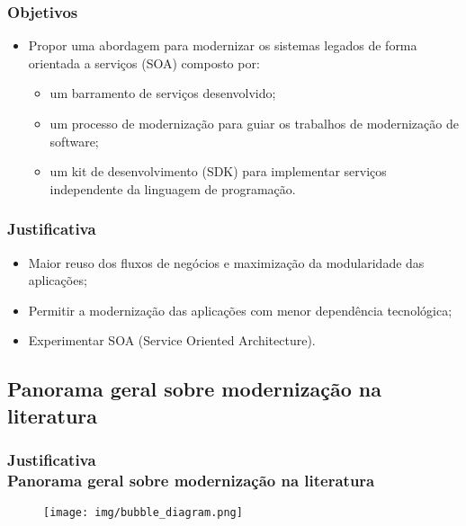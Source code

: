 \documentclass{beamer}
\begin{document}
\begin{frame}
  \frametitle{Objetivos}
  
    \begin{itemize}
       \item<1-> Propor uma abordagem para modernizar os sistemas legados de
forma orientada a serviços (SOA) composto por:

    \begin{itemize}
       \item<1->um barramento de serviços desenvolvido;
       \item<1->um processo de modernização para guiar os trabalhos de modernização de software; 
       \item<1->um kit de desenvolvimento (SDK) para implementar serviços independente da
       linguagem de programação.
    \end{itemize}
				
    \end{itemize}
    
\end{frame}





\begin{frame}
  \frametitle{Justificativa}
  
    \begin{itemize}
       \item<1->Maior reuso dos fluxos de negócios e maximização da
modularidade das aplicações;
       \item<1->Permitir a modernização das aplicações com menor dependência tecnológica;
       \item<1->Experimentar SOA (Service Oriented Architecture).
				
    \end{itemize}
    
\end{frame}


\subsection{Panorama geral sobre modernização na literatura}


\begin{frame}
  \frametitle{Justificativa \\ \small{Panorama geral sobre modernização na literatura}}

  	
	\begin{figure}
	\centering
		\texttt{[image: img/bubble\_diagram.png]}
	\end{figure}
  
\end{frame}
\end{document}
